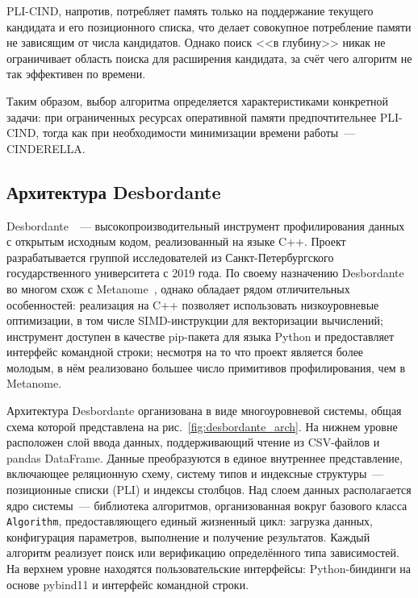 PLI-CIND, напротив, потребляет память только на поддержание текущего кандидата и его позиционного списка, что делает совокупное потребление памяти не зависящим от числа кандидатов. Однако поиск <<в глубину>> никак не ограничивает область поиска для расширения кандидата, за счёт чего алгоритм не так эффективен по времени.

Таким образом, выбор алгоритма определяется характеристиками конкретной задачи: при ограниченных ресурсах оперативной памяти предпочтительнее PLI-CIND, тогда как при необходимости минимизации времени работы~--- CINDERELLA.

\subsection{Архитектура Desbordante}

Desbordante~\cite{smirnov2025desbordante}~--- высокопроизводительный инструмент профилирования данных с открытым исходным кодом, реализованный на языке C++. Проект разрабатывается группой исследователей из Санкт-Петербургского государственного университета с 2019 года. По своему назначению Desbordante во многом схож с Metanome~\cite{papenbrock2015data}, однако обладает рядом отличительных особенностей: реализация на C++ позволяет использовать низкоуровневые оптимизации, в том числе SIMD-инструкции для векторизации вычислений; инструмент доступен в качестве pip-пакета для языка Python и предоставляет интерфейс командной строки; несмотря на то что проект является более молодым, в нём реализовано большее число примитивов профилирования, чем в Metanome.

Архитектура Desbordante организована в виде многоуровневой системы, общая схема которой представлена на рис.~\ref{fig:desbordante_arch}. На нижнем уровне расположен слой ввода данных, поддерживающий чтение из CSV-файлов и pandas DataFrame. Данные преобразуются в единое внутреннее представление, включающее реляционную схему, систему типов и индексные структуры~--- позиционные списки (PLI) и индексы столбцов. Над слоем данных располагается ядро системы~--- библиотека алгоритмов, организованная вокруг базового класса \texttt{Algorithm}, предоставляющего единый жизненный цикл: загрузка данных, конфигурация параметров, выполнение и получение результатов. Каждый алгоритм реализует поиск или верификацию определённого типа зависимостей. На верхнем уровне находятся пользовательские интерфейсы: Python-биндинги на основе pybind11 и интерфейс командной строки.

